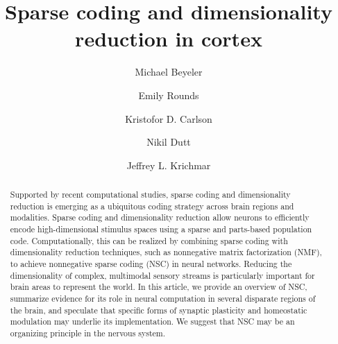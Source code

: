 \documentclass[review,12pt,sort&compress]{elsarticle}
\begin{document}
\begin{frontmatter}

\title{Sparse coding and dimensionality reduction in cortex}





\author[UCI,UW]{Michael Beyeler}
\author[UCI]{Emily Rounds}
\author[Sandia]{Kristofor D. Carlson}
\author[UCI]{Nikil Dutt}
\author[UCI]{Jeffrey L. Krichmar}
%
\address[UCI]{University of California, Irvine, Irvine, CA, USA}
\address[UW]{University of Washington, Seattle, WA, USA}
\address[Sandia]{Sandia National Laboratories, Albuquerque, NM, USA}


\begin{abstract}
Supported by recent computational studies, sparse coding and dimensionality reduction is emerging as a ubiquitous coding strategy across brain regions and modalities. Sparse coding and dimensionality reduction allow neurons to efficiently encode high-dimensional stimulus spaces using a sparse and parts-based population code. Computationally, this can be realized by combining sparse coding with dimensionality reduction techniques, such as nonnegative matrix factorization (NMF), to achieve nonnegative sparse coding (NSC) in neural networks. Reducing the dimensionality of complex, multimodal sensory streams is particularly important for brain areas to represent the world. In this article, we provide an overview of NSC, summarize evidence for its role in neural computation in several disparate regions of the brain, and speculate that specific forms of synaptic plasticity and homeostatic modulation may underlie its implementation. We  suggest that NSC may be an organizing principle in the nervous system.
\end{abstract}


\end{frontmatter}
\end{document}
